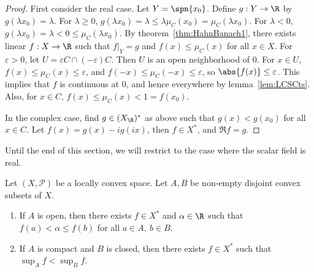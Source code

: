 \documentclass[a4paper]{article}
\begin{document}
\begin{proof}
	First consider the real case. Let $Y=\spn\{x_0\}$. Define $g:Y\to\R$ by $g(\lambda x_0)=\lambda$. For $\lambda\geq 0$, $g(\lambda x_0)=\lambda\leq\lambda\mu_C(x_0)=\mu_C(\lambda x_0)$. For $\lambda<0$, $g(\lambda x_0)=\lambda<0\leq\mu_C(\lambda x_0)$. By theorem~\ref{thm:HahnBanach1}, there exists linear $f:X\to\R$ such that $f|_Y=g$ and $f(x)\leq\mu_C(x)$ for all $x\in X$. For $\varepsilon>0$, let $U=\varepsilon C\cap(-\varepsilon) C$. Then $U$ is an open neighborhood of 0. For $x\in U$, $f(x)\leq\mu_C(x)\leq\varepsilon$, and $f(-x)\leq\mu_C(-x)\leq\varepsilon$, so $\abs{f(x)}\leq\varepsilon$. This implies that $f$ is continuous at 0, and hence everywhere by lemma~\ref{lem:LCSCts}. Also, for $x\in C$, $f(x)\leq\mu_C(x)<1=f(x_0)$.

	In the complex case, find $g\in(X_\R)^*$ as above such that $g(x)<g(x_0)$ for all $x\in C$. Let $f(x)=g(x)-ig(ix)$, then $f\in X^*$, and $\Re f=g$.
\end{proof}

\begin{remark}
  Until the end of this section, we will restrict to the case where the scalar field is real.
\end{remark}

\begin{nthm}\label{thm:HBSep2}
	Let $(X,\mathcal{P})$ be a locally convex space. Let $A,B$ be non-empty disjoint convex subsets of $X$.
	\begin{enumerate}[label=(\roman*)]
		\item If $A$ is open, then there exists $f\in X^*$ and $\alpha\in\R$ such that $f(a)<\alpha\leq f(b)$ for all $a\in A,\ b\in B$.
		\item If $A$ is compact and $B$ is closed, then there exists $f\in X^*$ such that $\sup_A f<\sup_B f$.
	\end{enumerate}
\end{nthm}
\end{document}
